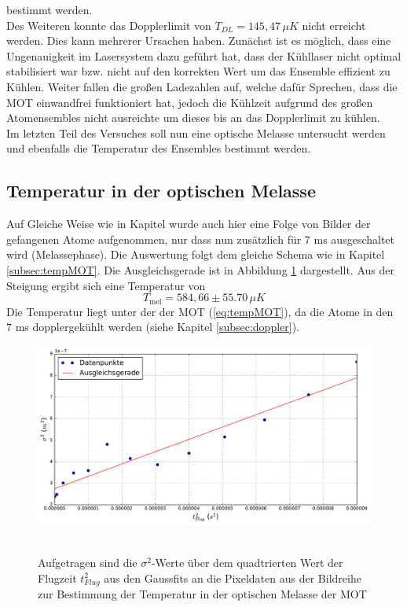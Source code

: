 \documentclass[twoside,colorback,accentcolor=tud4c,11pt]{tudreport}
\begin{document}
bestimmt werden.\\
Des Weiteren konnte das Dopplerlimit von $T_{DL}=145,47\,\si{\mu K}$ \cite{limit} nicht erreicht werden. Dies kann mehrerer Ursachen haben. Zunächst ist es möglich, dass eine Ungenauigkeit im Lasersystem dazu geführt hat, dass der Kühllaser nicht optimal stabilisiert war bzw. nicht auf den korrekten Wert um das Ensemble effizient zu Kühlen. Weiter fallen die großen Ladezahlen auf, welche dafür Sprechen, dass die MOT einwandfrei funktioniert hat, jedoch die Kühlzeit aufgrund des großen Atomensembles nicht ausreichte um dieses bis an das Dopplerlimit zu kühlen.\\
Im letzten Teil des Versuches soll nun eine optische Melasse untersucht werden und ebenfalls die Temperatur des Ensembles bestimmt werden.
\subsection{Temperatur in der optischen Melasse}
Auf Gleiche Weise wie in Kapitel \textit{} wurde auch hier eine Folge von Bilder der gefangenen Atome aufgenommen, nur dass nun zusätzlich für 7 ms ausgeschaltet wird (Melassephase). Die Auswertung folgt dem gleiche Schema wie in Kapitel \ref{subsec:tempMOT}. Die Ausgleichsgerade ist in Abbildung \ref{tmel} dargestellt. Aus der Steigung ergibt sich eine Temperatur von
\begin{equation}
T_{\text{mel}}=584,66 \pm 55.70\,\mu \si{K}
\end{equation}
Die Temperatur liegt unter der der MOT (\ref{eq:tempMOT}), da die Atome in den 7 ms dopplergekühlt werden (siehe Kapitel \ref{subsec:doppler}).
\begin{figure}[H]
\centering
   	\begin{minipage}[b]{0.85\textwidth}
   	\includegraphics[width=\textwidth]{graphics/tempmel.pdf}\
   	\end{minipage}
\caption{Aufgetragen sind die $\sigma^2$-Werte über dem quadtrierten Wert der Flugzeit $t_{Flug}^2$ aus den Gaussfits an die Pixeldaten aus der Bildreihe zur Bestimmung der Temperatur in der optischen Melasse der MOT}\label{tmel}	
\end{figure}
\end{document}
